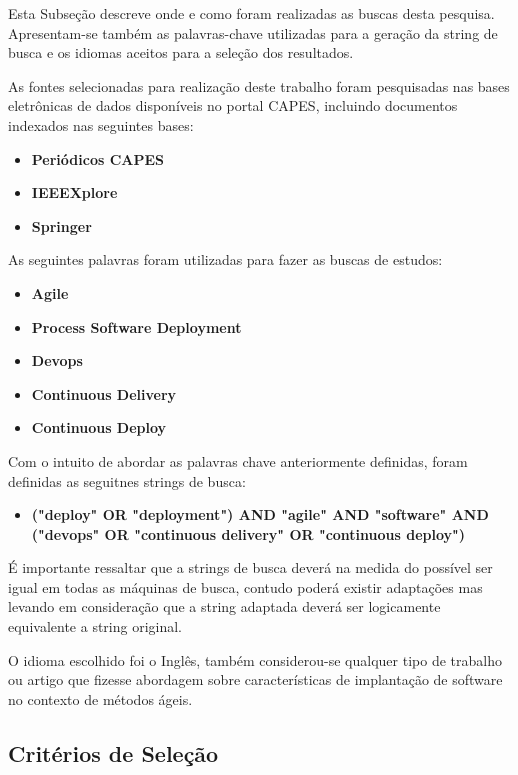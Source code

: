 \documentclass[12pt]{article}
\begin{document}
Esta  Subseção  descreve  onde  e  como  foram  realizadas
as  buscas  desta  pesquisa. Apresentam-se também as palavras-chave utilizadas para a geração da string  de busca e os idiomas aceitos para a seleção dos resultados.

As fontes selecionadas para realização deste trabalho foram pesquisadas nas bases eletrônicas de dados disponíveis no portal CAPES, incluindo documentos indexados nas seguintes bases:

 \begin{itemize}
   \item  \textbf{Periódicos CAPES}
   \item  \textbf{IEEEXplore}
   \item  \textbf{Springer}
 \end{itemize}

As seguintes palavras foram utilizadas para fazer as buscas de estudos:

 \begin{itemize}
   \item  \textbf{Agile}
   \item  \textbf{Process Software Deployment}
   \item  \textbf{Devops}
   \item  \textbf{Continuous Delivery}
   \item  \textbf{Continuous Deploy}

 \end{itemize}

Com o intuito de abordar as palavras chave anteriormente definidas, foram definidas as seguitnes strings de busca:

 \begin{itemize}
   \item  \textbf{("deploy" OR "deployment") AND  "agile" AND "software" AND ("devops" OR "continuous delivery" OR "continuous deploy") }
 \end{itemize}

É importante ressaltar que a strings de busca deverá na medida do possível ser igual em todas as máquinas de busca, contudo poderá existir adaptações mas levando em consideração que a string adaptada deverá ser logicamente equivalente a string original.

O idioma escolhido foi o Inglês, também considerou-se qualquer tipo de trabalho ou artigo que fizesse abordagem sobre características de implantação de software no contexto de métodos ágeis.

\subsection{Critérios de Seleção} \label{sec3:subsec4}
\end{document}
